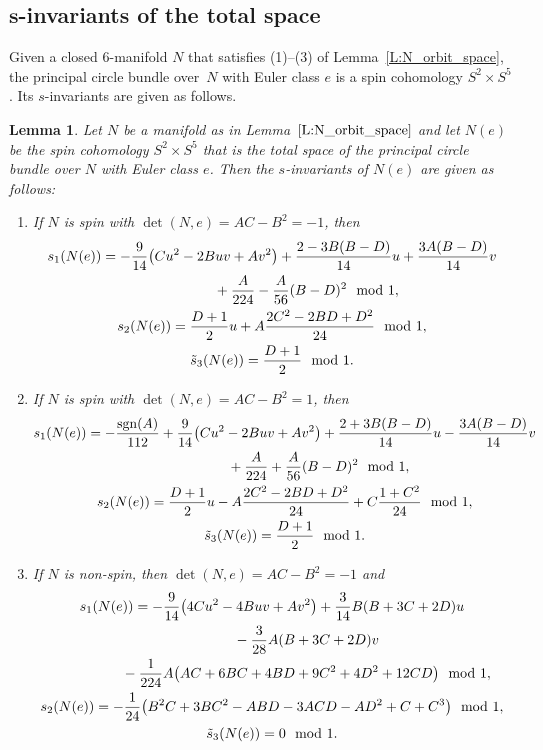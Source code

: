 \documentclass[10pt,a4paper]{amsart}
\numberwithin{equation}{section}
\newtheorem{Lemma}[Theorem]{Lemma}
\theoremstyle{definition}
\numberwithin{table}{section}
\begin{document}
\subsection[s-invariants of the total space]{$\boldsymbol{s}$-invariants of the total space}\label{SS:s-inv}

Given a closed $6$-manifold $N$ that satisfies (1)--(3) of Lemma~\ref{L:N_orbit_space}, the principal circle bundle over~$N$ with Euler class $e$ is a spin cohomology $S^2\times S^5$. Its $s$-invariants are given as follows.

\begin{Lemma}\label{L:s-inv}
	Let $N$ be a manifold as in Lemma~$\ref{L:N_orbit_space}$ and let $N(e)$ be the spin cohomology $S^2\times S^5$ that is the total space of the principal circle bundle over $N$ with Euler class $e$. Then the $s$-invariants of $N(e)$ are given as follows:
	\begin{enumerate}\itemsep=0pt
		\item[$(1)$] If $N$ is spin with $\det(N,e)=AC-B^2=-1$, then
		\begin{gather*}
			s_1(N(e))= -\frac{9}{14}\bigl(Cu^2-2Buv+Av^2\bigr)+\frac{2-3B(B-D)}{14}u+\frac{3A(B-D)}{14}v\\
			 \hphantom{s_1(N(e))=}{} +\frac{A}{224}-\frac{A}{56}(B-D)^2\mod 1,\\
			s_2(N(e))= \frac{D+1}{2}u+A\frac{2C^2-2BD+D^2}{24}\mod 1,\\
			\tilde{s}_3(N(e))= \frac{D+1}{2}\mod 1.
		\end{gather*}
		\item[$(2)$] If $N$ is spin with $\det(N,e)=AC-B^2=1$, then
		\begin{gather*}
			s_1(N(e))= -\frac{\mathrm{sgn}(A)}{112}+\frac{9}{14}\bigl(Cu^2-2Buv+Av^2\bigr)+\frac{2+3B(B-D)}{14}u-\frac{3A(B-D)}{14}v\\
			\hphantom{s_1(N(e))=}{} +\frac{A}{224}+\frac{A}{56}(B-D)^2\mod 1,\\
			s_2(N(e))= \frac{D+1}{2}u-A\frac{2C^2-2BD+D^2}{24}+C\frac{1+C^2}{24}\mod 1,\\
			\tilde{s}_3(N(e))= \frac{D+1}{2}\mod 1.
		\end{gather*}
		\item[$(3)$] If $N$ is non-spin, then $\det(N,e)=AC-B^2=-1$ and
		\begin{gather*}
			s_1(N(e))= -\frac{9}{14}\bigl(4Cu^2-4Buv+Av^2\bigr)+\frac{3}{14}B(B+3C+2D)u\\
			\hphantom{s_1(N(e))=}{} -\frac{3}{28}A(B+3C+2D)v\\
			\hphantom{s_1(N(e))=}{} -\frac{1}{224}A\bigl(AC+6BC+4BD+9C^2+4D^2+12CD\bigr)\mod 1,\\
			s_2(N(e))= -\frac{1}{24}\bigl(B^2C+3BC^2-ABD-3ACD-AD^2+C+C^3\bigr)\mod 1,\\
			\tilde{s}_3(N(e))= 0\mod 1.
		\end{gather*}
	\end{enumerate}
\end{Lemma}
\end{document}
